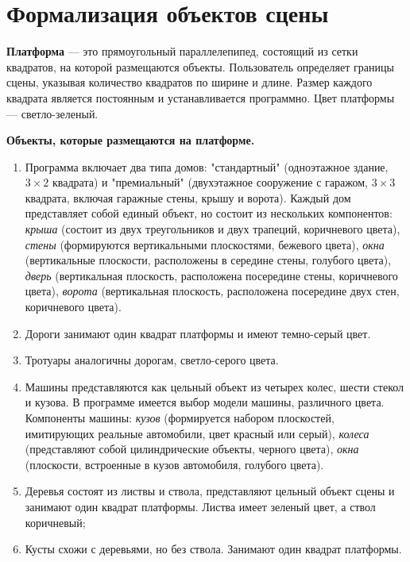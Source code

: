 

\section{Формализация объектов сцены}


\textbf{Платформа} --- это прямоугольный параллелепипед, состоящий из сетки квадратов, на которой размещаются объекты.
Пользователь определяет границы сцены, указывая количество квадратов по ширине и длине.
Размер каждого квадрата является постоянным и устанавливается программно.
Цвет платформы --- светло-зеленый.

\textbf{Объекты, которые размещаются на платформе.}

\begin{enumerate}
	\item Программа включает два типа домов: "стандартный" (одноэтажное здание, $3 \times 2$ квадрата) и "премиальный" (двухэтажное сооружение с гаражом, $3\times 3$ квадрата, включая гаражные стены, крышу и ворота). 
	Каждый дом представляет собой единый объект, но состоит из нескольких компонентов:
	\textit{крыша} (состоит из двух треугольников и двух трапеций, коричневого цвета),
	\textit{стены} (формируются вертикальными плоскостями, бежевого цвета),
	\textit{окна} (вертикальные плоскости, расположены в середине стены, голубого цвета), 
	\textit{дверь} (вертикальная плоскость, расположена посередине стены, коричневого цвета),
	\textit{ворота} (вертикальная плоскость, расположена посередине двух стен, коричневого цвета).
	
	\item Дороги занимают один квадрат платформы и имеют темно-серый цвет.

	\item Тротуары аналогичны дорогам, светло-серого цвета.
	
	\item Машины представляются как цельный объект из четырех колес, шести стекол и кузова. 
	В программе имеется выбор модели машины, различного цвета. Компоненты машины:
	\textit{кузов} (формируется набором плоскостей, имитирующих реальные автомобили, цвет красный или серый),
	\textit{колеса} (представляют собой цилиндрические объекты, черного цвета),
	\textit{окна} (плоскости, встроенные в кузов автомобиля, голубого цвета).

	\item Деревья состоят из листвы и ствола, представляют цельный объект сцены и занимают один квадрат платформы. Листва имеет зеленый цвет, а ствол коричневый;

	\item Кусты схожи с деревьями, но без ствола. Занимают один квадрат платформы.
\end{enumerate}

